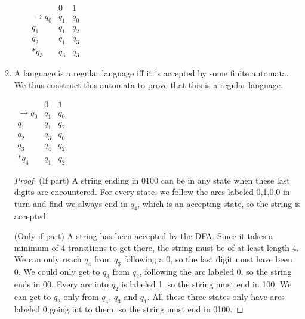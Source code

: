 \documentclass{article}
\begin{document}
\begin{enumerate}
\begin{enumerate}
                $ \begin{array}{r|c|c}
                            & 0 & 1 \\ \hline \hline
                    \to q_0 & q_1 & q_0 \\
                    q_1 & q_1 & q_2 \\
                    q_2 & q_1 & q_3 \\
                    *q_3 & q_3 & q_3
                \end{array}
                $

        \end{enumerate}

    \item
        A language is a regular language iff it is accepted by some finite automata. We thus construct this automata to prove that this is a regular language.

        $ \begin{array}{r|c|c}
            & 0 & 1 \\ \hline \hline
            \to q_0 & q_1 & q_0 \\
            q_1 & q_1 & q_2 \\
            q_2 & q_3 & q_0 \\
            q_3 & q_4 & q_2 \\
            *q_4 & q_1 & q_2
        \end{array}
        $

        \begin{proof}
            (If part) A string ending in 0100 can be in any state when these last digits are encountered. For every state, we follow the arcs labeled 0,1,0,0 in turn and find we always end in $q_4$, which is an accepting state, so the string is accepted.

            (Only if part) A string has been accepted by the DFA. Since it takes a minimum of 4 transitions to get there, the string must be of at least length 4. We can only reach $q_4$ from $q_3$ following a 0, so the last digit must have been 0. We could only get to $q_3$ from $q_2$, following the arc labeled 0, so the string ends in 00. Every arc into $q_2$ is labeled 1, so the string must end in 100. We can get to $q_2$ only from $q_4$, $q_3$ and $q_1$. All these three states only have arcs labeled 0 going int to them, so the string must end in 0100.
        \end{proof}

\end{enumerate}
\end{document}

